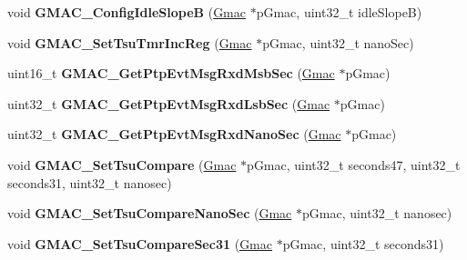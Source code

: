 \begin{DoxyCompactItemize}
\mbox{\label{group__gmac__defines_ga5fc2bbcb4e3f26084977b41447fcaeea}} 
void {\bfseries G\+M\+A\+C\+\_\+\+Config\+Idle\+SlopeB} (\mbox{\hyperlink{structGmac}{Gmac}} $\ast$p\+Gmac, uint32\+\_\+t idle\+SlopeB)
\item 
\mbox{\label{group__gmac__defines_gadd8f4c83e59d7c837c30633e5e78e9eb}} 
void {\bfseries G\+M\+A\+C\+\_\+\+Set\+Tsu\+Tmr\+Inc\+Reg} (\mbox{\hyperlink{structGmac}{Gmac}} $\ast$p\+Gmac, uint32\+\_\+t nano\+Sec)
\item 
\mbox{\label{group__gmac__defines_ga9fd2457926cb7ddacd08f955c32f609c}} 
uint16\+\_\+t {\bfseries G\+M\+A\+C\+\_\+\+Get\+Ptp\+Evt\+Msg\+Rxd\+Msb\+Sec} (\mbox{\hyperlink{structGmac}{Gmac}} $\ast$p\+Gmac)
\item 
\mbox{\label{group__gmac__defines_gab429e2cc198a50cf859fd1717a090dc0}} 
uint32\+\_\+t {\bfseries G\+M\+A\+C\+\_\+\+Get\+Ptp\+Evt\+Msg\+Rxd\+Lsb\+Sec} (\mbox{\hyperlink{structGmac}{Gmac}} $\ast$p\+Gmac)
\item 
\mbox{\label{group__gmac__defines_gae8fc9898aee6bbae491c0e425b5957d1}} 
uint32\+\_\+t {\bfseries G\+M\+A\+C\+\_\+\+Get\+Ptp\+Evt\+Msg\+Rxd\+Nano\+Sec} (\mbox{\hyperlink{structGmac}{Gmac}} $\ast$p\+Gmac)
\item 
\mbox{\label{group__gmac__defines_gabffcf2ac4ae28dd4b100012cefcd74b1}} 
void {\bfseries G\+M\+A\+C\+\_\+\+Set\+Tsu\+Compare} (\mbox{\hyperlink{structGmac}{Gmac}} $\ast$p\+Gmac, uint32\+\_\+t seconds47, uint32\+\_\+t seconds31, uint32\+\_\+t nanosec)
\item 
\mbox{\label{group__gmac__defines_gaa07aa6680a0d5002c69a72b2e6e00348}} 
void {\bfseries G\+M\+A\+C\+\_\+\+Set\+Tsu\+Compare\+Nano\+Sec} (\mbox{\hyperlink{structGmac}{Gmac}} $\ast$p\+Gmac, uint32\+\_\+t nanosec)
\item 
\mbox{\label{group__gmac__defines_gac39b72e967f24460cd7ab674d0d10247}} 
void {\bfseries G\+M\+A\+C\+\_\+\+Set\+Tsu\+Compare\+Sec31} (\mbox{\hyperlink{structGmac}{Gmac}} $\ast$p\+Gmac, uint32\+\_\+t seconds31)
\item 

\end{DoxyCompactItemize}
